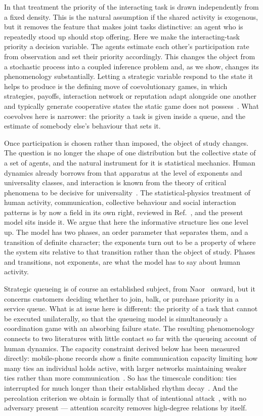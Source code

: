 \documentclass[aps,pre,twocolumn,superscriptaddress,floatfix,longbibliography]{revtex4-2}
\begin{document}
In that treatment the priority of the interacting task is drawn independently
from a fixed density. This is the natural assumption if the shared activity is
exogenous, but it removes the feature that makes joint tasks distinctive: an
agent who is repeatedly stood up should stop offering. Here we make the
interacting-task priority a decision variable. The agents estimate each other's
participation rate from observation and set their priority accordingly. This
changes the object from a stochastic process into a coupled inference problem
and, as we show, changes its phenomenology substantially. Letting a
strategic variable respond to the state it helps to produce is the defining move
of coevolutionary games, in which strategies, payoffs, interaction network or
reputation adapt alongside one another and typically generate cooperative states
the static game does not possess~\cite{perc2010}. What coevolves here is
narrower: the priority a task is given inside a queue, and the estimate of
somebody else's behaviour that sets it.

Once participation is chosen rather than imposed, the object of study changes.
The question is no longer the shape of one distribution but the collective state
of a set of agents, and the natural instrument for it is statistical mechanics.
Human dynamics already borrows from that apparatus at the level of exponents and
universality classes, and interaction is known from the theory of critical
phenomena to be decisive for universality~\cite{stanley1971}. The
statistical-physics treatment of human activity, communication, collective
behaviour and social interaction patterns is by now a field in its own right,
reviewed in Ref.~\cite{jusup2022}, and the present model sits inside it. We argue that here
the informative structure lies one level up. The model has two phases, an order
parameter that separates them, and a transition of definite character; the
exponents turn out to be a property of where the system sits relative to that
transition rather than the object of study. Phases and transitions, not
exponents, are what the model has to say about human activity.

Strategic queueing is of course an established subject, from
Naor~\cite{naor1969} onward, but it concerns customers deciding whether to join,
balk, or purchase priority in a service queue. What is at issue here is
different: the priority of a task that cannot be executed unilaterally, so that
the queueing model is simultaneously a coordination game with an absorbing
failure state. The resulting phenomenology
connects to two literatures with little contact so far with the queueing account
of human dynamics. The capacity constraint derived below has been measured
directly: mobile-phone records show a finite communication capacity limiting how
many ties an individual holds active, with larger networks maintaining weaker
ties rather than more communication~\cite{miritello2013,dunbar1992,saramaki2014}.
So has the timescale condition: ties interrupted for much longer than their
established rhythm decay~\cite{navarro2017}. And the percolation criterion we
obtain is formally that of intentional
attack~\cite{cohen2000,cohen2001,albert2000}, with no adversary present ---
attention scarcity removes high-degree relations by itself.
\end{document}

